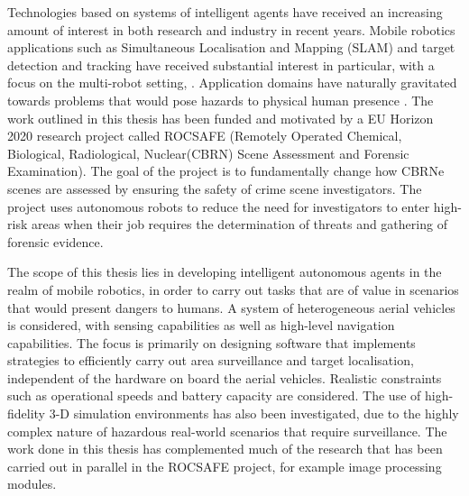 
Technologies based on systems of intelligent agents have received an increasing amount of interest in both research and industry in recent years. Mobile robotics applications such as Simultaneous Localisation and Mapping (SLAM)\cite{Thrun:2005:ProbabilisticRobotics} and target detection and tracking have received substantial interest in particular, with a focus on the multi-robot setting\cite{Saeedi2016Multiple-RobotReview}, \cite{Robin2016Multi-robotSurvey}. 
Application domains have naturally gravitated towards problems that would pose hazards to physical human presence \cite{Muller2014ApplicationSurvey}. The work outlined in this thesis has been funded and motivated by a EU Horizon 2020 research project called ROCSAFE (Remotely Operated Chemical, Biological, Radiological, Nuclear(CBRN) Scene Assessment and Forensic Examination)\cite{Bagherzadeh2017ROCSAFE:Incidents}. The goal of the project is to fundamentally change how CBRNe scenes are assessed by ensuring the safety of crime scene investigators. The project uses autonomous robots to reduce the need for investigators to enter high-risk areas when their job requires the determination of threats and gathering of  forensic evidence.\par

The scope of this thesis lies in developing intelligent autonomous agents in the realm of mobile robotics, in order to carry out tasks that are of value in scenarios that would present dangers to humans. A system of heterogeneous aerial vehicles is considered, with sensing capabilities as well as high-level navigation capabilities. The focus is primarily on designing software that implements strategies to efficiently carry out area surveillance and target localisation, independent of the hardware on board the aerial vehicles. Realistic constraints such as operational speeds and battery capacity are considered. The use of high-fidelity 3-D simulation environments has also been investigated, due to the highly complex nature of hazardous real-world scenarios that require surveillance. The work done in this thesis has complemented much of the research that has been carried out in parallel in the ROCSAFE project, for example image processing modules.\par